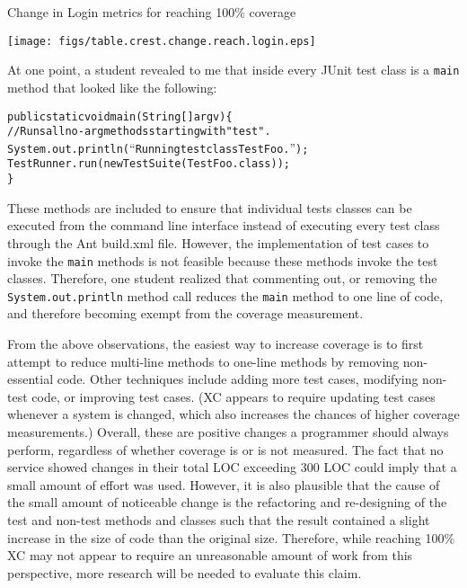 \begin{table}[htbp]
  \begin{center}
    \caption{Change in Login metrics for reaching 100\% coverage}
    \texttt{[image: figs/table.crest.change.reach.login.eps]}
  \end{center}
\end{table}

At one point, a student revealed to me that inside every JUnit test class
is a {\tt main} method that looked like the following:

\begin{alltt}
{\small{}public static void main(String[] argv) \{
  //Runs all no-arg methods starting with "test".
  System.out.println(``Running testclass TestFoo.'');
  TestRunner.run(new TestSuite(TestFoo.class));
\}
}
\end{alltt}
These methods are included to ensure that individual tests classes can be
executed from the command line interface instead of executing every test
class through the Ant build.xml file.  However, the implementation of test
cases to invoke the {\tt main} methods is not feasible because these
methods invoke the test classes.  Therefore, one student realized that
commenting out, or removing the {\tt System.out.println} method call
reduces the {\tt main} method to one line of code, and therefore becoming
exempt from the coverage measurement.

From the above observations, the easiest way to increase coverage is to
first attempt to reduce multi-line methods to one-line methods by removing
non-essential code.  Other techniques include adding more test cases,
modifying non-test code, or improving test cases.  (XC appears to require
updating test cases whenever a system is changed, which also increases the
chances of higher coverage measurements.)  Overall, these are positive
changes a programmer should always perform, regardless of whether coverage
is or is not measured.  The fact that no service showed changes in their
total LOC exceeding 300 LOC could imply that a small amount of effort was
used.  However, it is also plausible that the cause of the small amount of
noticeable change is the refactoring and re-designing of the test and
non-test methods and classes such that the result contained a slight
increase in the size of code than the original size.  Therefore, while
reaching 100\% XC may not appear to require an unreasonable amount of work
from this perspective, more research will be needed to evaluate this claim.

